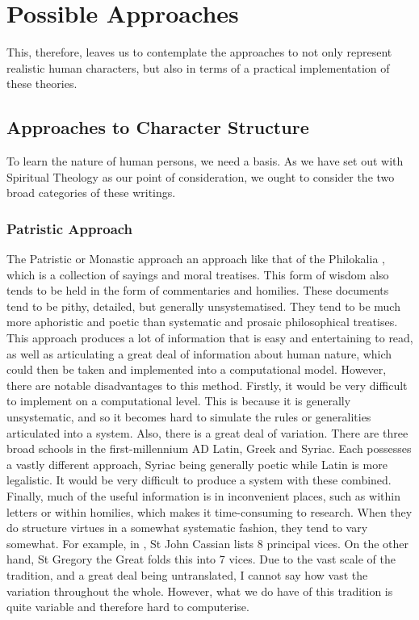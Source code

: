 \documentclass[12pt]{article}
\begin{document}
\section{Possible Approaches}
This, therefore, leaves us to contemplate the approaches to not only represent realistic human characters, but also in terms of a practical implementation of these theories. 
\subsection{Approaches to Character Structure}
To learn the nature of human persons, we need a basis. As we have set out with Spiritual Theology as our point of consideration, we ought to consider the two broad categories of these writings.
\subsubsection{Patristic Approach}
The Patristic or Monastic approach an approach like that of the Philokalia \cite{1983philokalia}, which is a collection of sayings and moral treatises. This form of wisdom also tends to be held in the form of commentaries and homilies. These documents tend to be pithy, detailed, but generally unsystematised. They tend to be much more aphoristic and poetic than systematic and prosaic philosophical treatises. This approach produces a lot of information that is easy and entertaining to read, as well as articulating a great deal of information about human nature, which could then be taken and implemented into a computational model. However, there are notable disadvantages to this method. Firstly, it would be very difficult to implement on a computational level. This is because it is generally unsystematic, and so it becomes hard to simulate the rules or generalities articulated into a system. Also, there is a great deal of variation. There are three broad schools in the first-millennium AD \: Latin, Greek and Syriac. Each possesses a vastly different approach, Syriac being generally poetic while Latin is more legalistic. It would be very difficult to produce a system with these combined. Finally, much of the useful information is in inconvenient places, such as within letters or within homilies, which makes it time-consuming to research. When they do structure virtues in a somewhat systematic fashion, they tend to vary somewhat. For example, in \cite{1983philokalia}, St John Cassian lists 8 principal vices. On the other hand, St Gregory the Great folds this into 7 vices. Due to the vast scale of the tradition, and a great deal being untranslated, I cannot say how vast the variation throughout the whole. However, what we do have of this tradition is quite variable and therefore hard to computerise. \\
\end{document}
